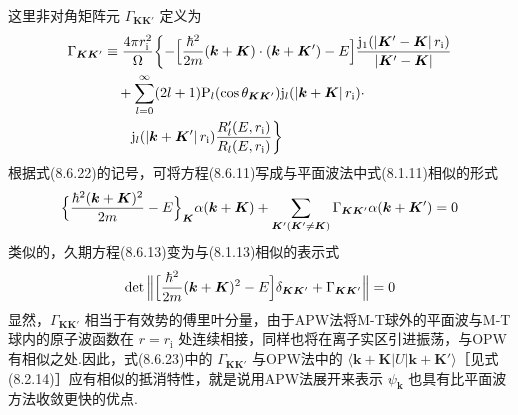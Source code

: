 这里非对角矩阵元 $\Gamma_{\boldsymbol{K}\boldsymbol{K}'}$ 定义为
\begin{equation}
\begin{aligned}
  \Gamma_{\boldsymbol{K}\boldsymbol{K}'}&\equiv\frac{4\pi r_{\mathrm{i}}^{2}}{\Omega}\biggl\{
  -\Bigl[\frac{\hbar^{2}}{2m}(\boldsymbol{k}+\boldsymbol{K})\cdot(\boldsymbol{k}+\boldsymbol{K}')-E\Bigr]
  \frac{\mathrm{j}_{1}(|\boldsymbol{K}'-\boldsymbol{K}|\,r_{\mathrm{i}})}{|\boldsymbol{K}'-\boldsymbol{K}|}\\
  &\quad+\sum_{l=0}^{\infty}(2l+1)\mathrm{P}_{l}(\cos\theta_{\boldsymbol{K}\boldsymbol{K}'})\mathrm{j}_{l}(|\boldsymbol{k}+\boldsymbol{K}|\,r_{\mathrm{i}})\cdot\\
  &\qquad\mathrm{j}_{l}(|\boldsymbol{k}+\boldsymbol{K}'|\,r_{\mathrm{i}})\frac{R_{l}'(E,r_{\mathrm{i}})}{R_{l}(E,r_{\mathrm{i}})}\biggr\}
\end{aligned}
\end{equation}
根据式(8.6.22)的记号，可将方程(8.6.11)写成与平面波法中式(8.1.11)相似的形式
\begin{equation}
  \Bigl\{\frac{\hbar^{2}(\boldsymbol{k}+\boldsymbol{K})^{2}}{2m}-E\Bigr\}_{\boldsymbol{K}}\alpha(\boldsymbol{k}+\boldsymbol{K})
  +\sum_{\boldsymbol{K}'(\boldsymbol{K}'\neq\boldsymbol{K})}\Gamma_{\boldsymbol{K}\boldsymbol{K}'}\alpha(\boldsymbol{k}+\boldsymbol{K}')=0
\end{equation}
类似的，久期方程(8.6.13)变为与(8.1.13)相似的表示式
\begin{equation}
  \mathrm{det}\,\Bigl\|\Bigl[\frac{\hbar^{2}}{2m}(\boldsymbol{k}+\boldsymbol{K})^{2}-E\Bigr]\delta_{\boldsymbol{K}\boldsymbol{K}'}
  +\Gamma_{\boldsymbol{K}\boldsymbol{K}'}\Bigr\|=0
\end{equation}
显然，$\Gamma_{\boldsymbol{K}\boldsymbol{K}'}$ 相当于有效势的傅里叶分量，由于APW法将M-T球外的平面波与M-T球内的原子波函数在 $r=r_{\mathrm{i}}$ 处连续相接，同样也将在离子实区引进振荡，与OPW有相似之处.因此，式(8.6.23)中的 $\Gamma_{\boldsymbol{K}\boldsymbol{K}'}$ 与OPW法中的 $\langle\boldsymbol{k}+\boldsymbol{K}|U|\boldsymbol{k}+\boldsymbol{K}'\rangle$［见式(8.2.14)］应有相似的抵消特性，就是说用APW法展开来表示 $\psi_{\boldsymbol{k}}$ 也具有比平面波方法收敛更快的优点.

